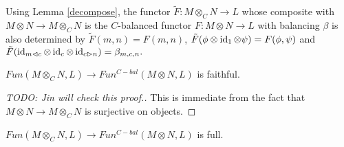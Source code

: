   \begin{remark}
    Using Lemma \ref{decompose}, the functor $\tilde{F}:M\otimes_C N\to L$
    whose composite with $M\otimes N\to M\otimes_C N$ is the $C$-balanced
    functor $F:M\otimes N\to L$ with balancing $\beta$ is also determined by
    $\tilde{F}(m,n)=F(m,n)$,
    $\tilde{F}(\phi\otimes\operatorname{id}_1\otimes\psi)=F(\phi,\psi)$ and
    $\tilde{F}(\operatorname{id}_{m\lhd c}\otimes\operatorname{id}_c\otimes\operatorname{id}_{c\rhd n})=\beta_{m,c,n}.$
  \end{remark}

\begin{lemma}\label{faithful}
  $Fun(M\otimes_C N,L)\to Fun^{C-bal}(M\otimes N,L)$ is faithful.
\end{lemma}

\begin{proof}
  [TODO: Jin will check this proof.]
  This is immediate from the fact that $M\otimes N \to M\otimes_C N$ is
  surjective on objects.
\end{proof}

\begin{lemma}\label{full}
  $Fun(M\otimes_C N,L)\to Fun^{C-bal}(M\otimes N,L)$ is full.
\end{lemma}

